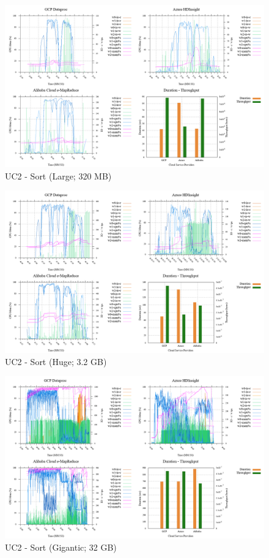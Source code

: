 \documentclass[review]{elsarticle}
\begin{document}
\begin{figure}[b]
	\caption{UC2 - Sort (Large; 320 MB)}
	\includegraphics[width=\textwidth]{uc2-srt-l-cmidt}
	\centering
\end{figure}

\begin{figure}[b]
	\caption{UC2 - Sort (Huge; 3.2 GB)}
	\includegraphics[width=\textwidth]{uc2-srt-h-cmidt}
	\centering
\end{figure}

\begin{figure}[b]
	\caption{UC2 - Sort (Gigantic; 32 GB)}
	\includegraphics[width=\textwidth]{uc2-srt-g-cmidt}
	\centering
\end{figure}
\end{document}
